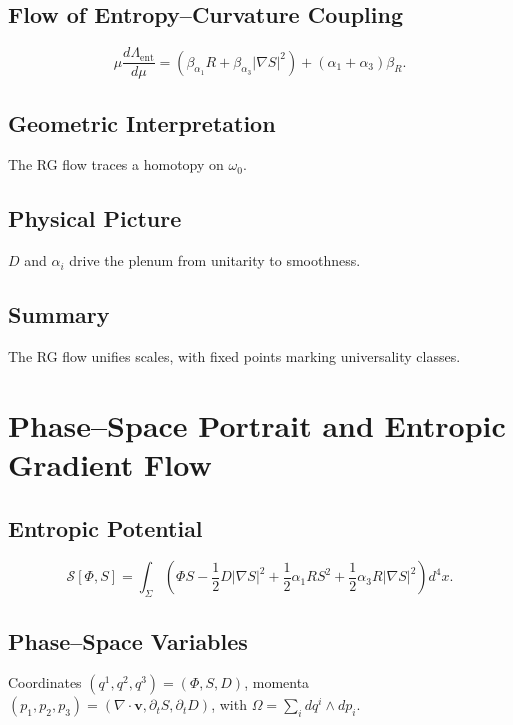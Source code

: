 \documentclass[12pt]{article}
\begin{document}
\subsection{Flow of Entropy–Curvature Coupling}

\[
\mu \frac{d \Lambda_{\mathrm{ent}}}{d \mu} = (\beta_{\alpha_1} R + \beta_{\alpha_3} |\nabla S|^2) + (\alpha_1 + \alpha_3) \beta_R.
\]

\subsection{Geometric Interpretation}

The RG flow traces a homotopy on \(\omega_0\).

\subsection{Physical Picture}

\(D\) and \(\alpha_i\) drive the plenum from unitarity to smoothness.

\subsection{Summary}

The RG flow unifies scales, with fixed points marking universality classes.

\section{Phase–Space Portrait and Entropic Gradient Flow}
\label{app:phase-space}

\subsection{Entropic Potential}

\[
\mathcal{S}[\Phi, S] = \int_\Sigma \left( \Phi S - \frac{1}{2} D |\nabla S|^2 + \frac{1}{2} \alpha_1 R S^2 + \frac{1}{2} \alpha_3 R |\nabla S|^2 \right) d^4x.
\]

\subsection{Phase–Space Variables}

Coordinates \((q^1, q^2, q^3) = (\Phi, S, D)\), momenta \((p_1, p_2, p_3) = (\nabla \cdot \mathbf{v}, \partial_t S, \partial_t D)\), with \(\Omega = \sum_i dq^i \wedge dp_i\).
\end{document}
